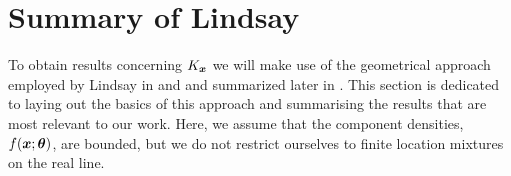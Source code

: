 	
\section{Summary of Lindsay}
	To obtain results concerning $K_{\bm{{x}}}$ we will make use of the geometrical approach employed by Lindsay in \cite{Lindsay1983-tf} and \cite{Lindsay1983a-he} and summarized later in \cite[Chapter 5]{Lindsay1995-sq}. This section is dedicated to laying out the basics of this approach and summarising the results that are most relevant to our work. Here, we assume that the component densities, $f({\bm{{x}}};{\bm{{\theta}}})$, are bounded, but we do not restrict ourselves to finite location mixtures on the real line.

